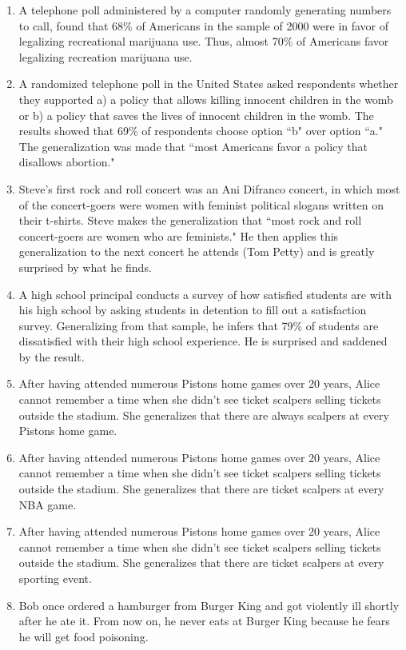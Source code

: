 \begin{enumerate}
\item A telephone poll administered by a computer randomly generating
numbers to call, found that 68\% 
of Americans in the sample of 2000
were in favor of legalizing recreational marijuana use. Thus, almost
70\% 
of Americans favor legalizing recreation marijuana use.

\item A randomized telephone poll in the United States asked respondents
whether they supported a) a policy that allows killing innocent children
in the womb or b) a policy that saves the lives of innocent children in
the womb. The results showed that 69\% 
of respondents choose
option ``b" over option ``a." The generalization was made that ``most
Americans favor a policy that disallows abortion."

\item Steve's first rock and roll concert was an Ani Difranco concert, in which
most of the concert-goers were women with feminist political slogans
written on their t-shirts. Steve makes the generalization that ``most
rock and roll concert-goers are women who are feminists." He then
applies this generalization to the next concert he attends (Tom Petty)
and is greatly surprised by what he finds.

\item A high school principal conducts a survey of how satisfied students are
with his high school by asking students in detention to fill out a
satisfaction survey. Generalizing from that sample, he infers that 79\%
of students are dissatisfied with their high school experience. He is
surprised and saddened by the result.

\item After having attended numerous Pistons home games over 20 years,
Alice cannot remember a time when she didn't see ticket scalpers
selling tickets outside the stadium. She generalizes that there are
always scalpers at every Pistons home game.

\item After having attended numerous Pistons home games over 20 years,
Alice cannot remember a time when she didn't see ticket scalpers
selling tickets outside the stadium. She generalizes that there are
ticket scalpers at every NBA game.

\item After having attended numerous Pistons home games over 20 years,
Alice cannot remember a time when she didn't see ticket scalpers
selling tickets outside the stadium. She generalizes that there are
ticket scalpers at every sporting event.

\item Bob once ordered a hamburger from Burger King and got violently ill
shortly after he ate it. From now on, he never eats at Burger King
because he fears he will get food poisoning.
\end{enumerate}

